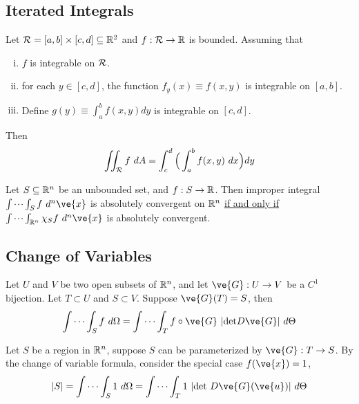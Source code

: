 \documentclass[11pt]{article}
\begin{document}
		\subsection{Iterated Integrals}
			\begin{theorem}
				Let $\mathcal{{R}} = [a,b] \times [c,d] \subseteq \mathbb{R}^2$ and $f: \mathcal{{R}} \to \mathbb{R}$ is bounded. Assuming that
				\begin{enumerate}[(i)]
					\item $f$ is integrable on $\mathcal{{R}}$.
					\item for each $y \in [c,d]$, the function $f_y(x) \equiv f(x,y)$ is integrable on $[a,b]$.
					\item Define $g(y) \equiv \int_a^b f(x, y) dy$ is integrable on $[c,d]$.
				\end{enumerate}
				Then 
				\begin{equation}
					\iint_{\mathcal{{R}}} f\ dA = \int_c^d \Big ( \int_a^b f(x,y)\ dx\Big)dy
				\end{equation}
			\end{theorem}
		
		\begin{proposition}
			Let $S \subseteq \mathbb{R}^n$ be an unbounded set, and $f: S \to \mathbb{R}$.
			Then improper integral $\idotsint_{S} f\ d^n \ve{x}$ is absolutely convergent on $\mathbb{R}^n$ \ul{if and only if} $\idotsint_{\R^n} \chi_S f\ d^n \ve{x}$ is absolutely convergent.
		\end{proposition}
	
		\subsection{Change of Variables}
			\begin{theorem}
				Let $U$ and $V$ be two open subsets of $\mathbb{R}^n$, and let $\ve{G}: U \to V$ be a $C^1$ bijection. Let $T \subset U$ and $S \subset V$. Suppose $\ve{G}(T) = S$, then
				\begin{equation}
					\int \cdots \int_S f\ d\Omega = \int \cdots \int_T f\circ\ve{G}\ |\tx{det}D\ve{G}|\ d\Theta
				\end{equation}
			\end{theorem}
			
			\begin{corollary}
				Let $S$ be a region in $\mathbb{R}^n$, suppose $S$ can be parameterized by $\ve{G}: T \to S$. By the change of variable formula, consider the special case $f(\ve{x})=1$, 
				\begin{equation}
					|S| = \int \cdots \int_S 1\ d\Omega = \int \cdots \int_T 1\ |\tx{det }D\ve{G}(\ve{u})|\ d\Theta
				\end{equation}
			\end{corollary}
			
\end{document}

